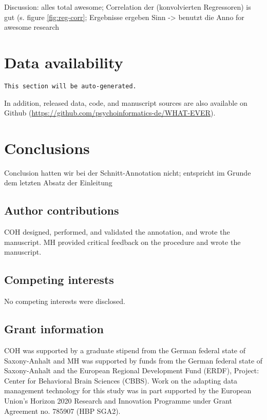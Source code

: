 \documentclass[10pt,a4paper,onecolumn]{article}
\begin{document}
Discussion: alles total awesome; Correlation der (konvolvierten Regressoren) is gut (s. figure \ref{fig:reg-corr}; Ergebnisse ergeben Sinn -> benutzt die Anno for awesome research

\section*{Data availability}
\texttt{This section will be auto-generated.}

In addition, released data, code, and manuscript sources are also available on
Github (\url{https://github.com/psychoinformatics-de/WHAT-EVER}).

\section*{Conclusions}
Conclusion hatten wir bei der Schnitt-Annotation nicht; entspricht im Grunde dem letzten Absatz der Einleitung


\subsection*{Author contributions}
COH designed, performed, and validated the annotation, and wrote the manuscript.
MH provided critical feedback on the procedure and wrote the manuscript.

\subsection*{Competing interests}
No competing interests were disclosed.

\subsection*{Grant information}

COH was supported by a graduate stipend from the German federal state of
Saxony-Anhalt and MH was supported by funds from the German federal state of
Saxony-Anhalt and the European Regional Development Fund (ERDF), Project:
Center for Behavioral Brain Sciences (CBBS). Work on the adapting data
management technology for this study was in part supported by the European
Union’s Horizon 2020 Research and Innovation Programme under Grant Agreement
no. 785907 (HBP SGA2).
\end{document}

